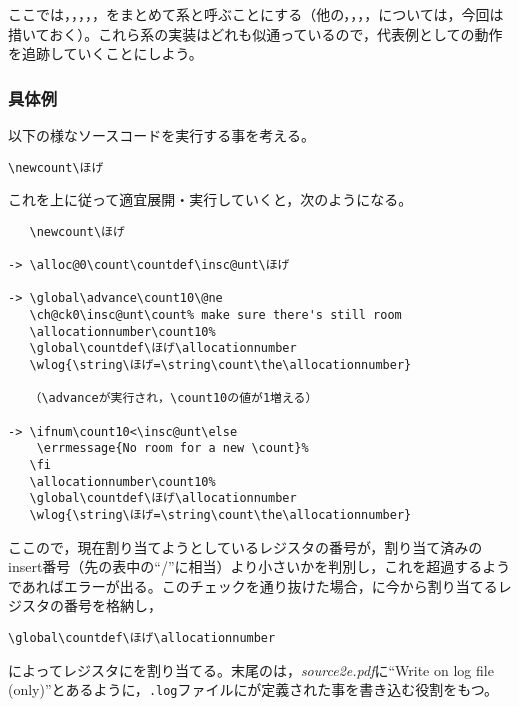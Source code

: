 \documentclass[autodetect-engine,dvipdfmx]{jsarticle}
\begin{document}
ここでは，，，，，をまとめて系と呼ぶことにする（他の，，，，については，今回は措いておく）。これら系の実装はどれも似通っているので，代表例としての動作を追跡していくことにしよう。

\subsubsection{具体例}
以下の様なソースコードを実行する事を考える。
\texsource
\begin{lstlisting}
\newcount\ほげ
\end{lstlisting}
これを上に従って適宜展開・実行していくと，次のようになる。
\begin{lstlisting}
   \newcount\ほげ

-> \alloc@0\count\countdef\insc@unt\ほげ

-> \global\advance\count10\@ne
   \ch@ck0\insc@unt\count% make sure there's still room
   \allocationnumber\count10%
   \global\countdef\ほげ\allocationnumber
   \wlog{\string\ほげ=\string\count\the\allocationnumber}

   （\advanceが実行され，\count10の値が1増える）

-> \ifnum\count10<\insc@unt\else
    \errmessage{No room for a new \count}%
   \fi
   \allocationnumber\count10%
   \global\countdef\ほげ\allocationnumber
   \wlog{\string\ほげ=\string\count\the\allocationnumber}
\end{lstlisting}

ここので，現在割り当てようとしているレジスタの番号が，割り当て済みのinsert番号（先の表中の``/''に相当）より小さいかを判別し，これを超過するようであればエラーが出る。このチェックを通り抜けた場合，に今から割り当てるレジスタの番号を格納し，
\begin{lstlisting}
\global\countdef\ほげ\allocationnumber
\end{lstlisting}
によってレジスタにを割り当てる。末尾のは，\textit{source2e.pdf}に``Write on log file (only)''とあるように，\texttt{.log}ファイルにが定義された事を書き込む役割をもつ。
\end{document}
